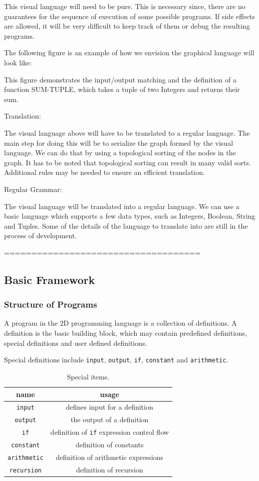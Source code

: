 \documentclass[12pt,UTF8,a4]{article}
\newcommand{\code}[1]{\texttt{#1}}
\begin{document}
This visual language will need to be pure. This is necessary since,
there are no guarantees for the sequence of execution of some possible
programs. If side effects are allowed, it will be very difficult to
keep track of them or debug the resulting programs.

The following figure is an example of how we envision the graphical
language will look like:

This figure demonstrates the input/output matching and the definition
of a function SUM-TUPLE, which takes a tuple of two Integers and
returns their sum.

Translation:

The visual language above will have to be translated to a regular
language. The main step for doing this will be to serialize the graph
formed by the visual language. We can do that by using a topological
sorting of the nodes in the graph. It has to be noted that topological
sorting can result in many valid sorts. Additional rules may be needed
to ensure an efficient translation.


Regular Grammar:

The visual language will be translated into a regular language. We can use a basic language which  supports a few data types, such as Integers, Boolean, String and Tuples. Some of the details of the language to translate into are still in the process of development.

====================================

\subsection{Basic Framework}
\subsubsection{Structure of Programs}
A program in the 2D programming language is a collection of definitions. A definition is the basic building block, which may contain predefined definitions, special definitions and user defined definitions.

Special definitions include \code{input}, \code{output}, \code{if}, \code{constant} and \code{arithmetic}.
\begin{table}[h]
\center
\begin{tabular}{c|c}
\hline
name & usage \\
\hline
\code{input} & defines input for a definition\\
\code{output} & the output of a definition\\
\code{if} & definition of \code{if} expression control flow \\
\code{constant} & definition of constants \\
\code{arithmetic} & definition of arithmetic expressions \\
\code{recursion} & definition of recursion\\
\hline
\end{tabular}
\caption{Special items.}\label{tab:sitems}
\end{table}
\end{document}
